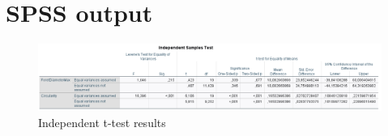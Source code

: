 \documentclass[dutch, a4paper, 11pt]{article}
\begin{document}
\section{SPSS output}

\begin{figure}[H]
    \includegraphics[scale=0.6]{outpt_t_test.png}
    \caption{Independent t-test results}
    \label{fig:t-test}
\end{figure}
\end{document}
